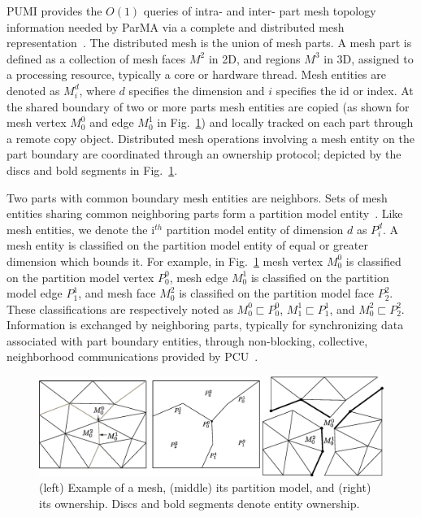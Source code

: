 PUMI provides the $O(1)$ queries of intra- and
inter- part mesh topology information needed by ParMA via a complete and
distributed mesh representation~\cite{ibanez2016pumi,WOLFHPC}.
The distributed mesh is the union of mesh parts.
A mesh part is defined as a collection of mesh faces $M^2$ in 2D, and regions
$M^3$ in 3D, assigned to a processing resource, typically a core or hardware
thread.
Mesh entities are denoted as $M^d_i$, where $d$ specifies the
dimension and $i$ specifies the id or index.
At the shared boundary of two or more parts mesh entities are copied (as shown
for mesh vertex $M^0_0$ and edge $M^1_0$ in Fig.~\ref{fig:distMesh}) and
locally tracked on each part through a remote copy object.
Distributed mesh operations involving a mesh entity on the part
boundary are coordinated through an ownership protocol; depicted by the discs
and bold segments in Fig.~\ref{fig:distMesh}.

Two parts with common boundary mesh entities are neighbors.
Sets of mesh entities sharing common neighboring parts form a partition model
entity~\cite{seol2005fmdb}.
Like mesh entities, we denote the i$^{th}$ partition model entity of dimension $d$
as $P^d_i$.
A mesh entity is classified on the partition model entity of equal or greater
dimension which bounds it.
For example, in Fig.~\ref{fig:distMesh} mesh vertex $M^0_0$ is classified on
the partition model vertex $P^0_0$, mesh edge $M^1_0$ is classified on the
partition model edge $P^1_1$, and mesh face $M^2_0$ is classified on the
partition model face $P^2_2$.
These classifications are respectively noted as $M^{0}_0 \sqsubset
P^{0}_{0}$, $M^{1}_1 \sqsubset P^{1}_{1}$, and $M^{2}_0 \sqsubset P^{2}_{2}$.
Information is exchanged by neighboring parts, typically for synchronizing data
associated with part boundary entities, through non-blocking, collective,
neighborhood communications provided by
PCU~\cite{ibanez2016hybrid,ovcharenko2012neighborhood}.

\begin{figure} \centering
  \includegraphics[width=\textwidth]{figs/distMeshAndPtnMdl.eps}
  \caption{
    (left) Example of a mesh, (middle) its partition model, and (right) its
    ownership.
    Discs and bold segments denote entity ownership.
  }
  \label{fig:distMesh}
\end{figure}
